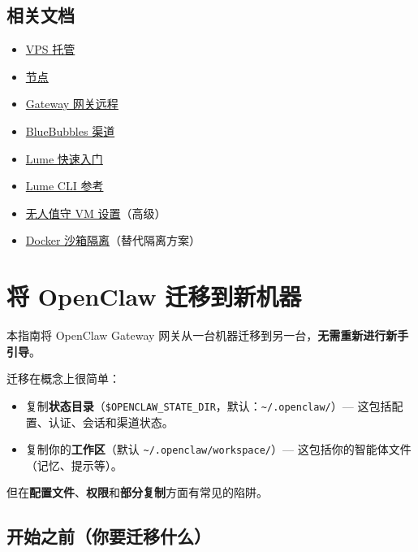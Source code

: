\hrulefill


\subsection{相关文档}


\begin{itemize}
  \item \href{/vps}{VPS 托管}
  \item \href{/nodes}{节点}
  \item \href{/gateway/remote}{Gateway 网关远程}
  \item \href{/channels/bluebubbles}{BlueBubbles 渠道}
  \item \href{https://cua.ai/docs/lume/guide/getting-started/quickstart}{Lume 快速入门}
  \item \href{https://cua.ai/docs/lume/reference/cli-reference}{Lume CLI 参考}
  \item \href{https://cua.ai/docs/lume/guide/fundamentals/unattended-setup}{无人值守 VM 设置}（高级）
  \item \href{/install/docker}{Docker 沙箱隔离}（替代隔离方案）
\end{itemize}



\clearpage

\section{将 OpenClaw 迁移到新机器}


本指南将 OpenClaw Gateway 网关从一台机器迁移到另一台，\textbf{无需重新进行新手引导}。

迁移在概念上很简单：

\begin{itemize}
  \item 复制\textbf{状态目录}（\texttt{\$OPENCLAW\_STATE\_DIR}，默认：\texttt{\textasciitilde{}/.openclaw/}）— 这包括配置、认证、会话和渠道状态。
  \item 复制你的\textbf{工作区}（默认 \texttt{\textasciitilde{}/.openclaw/workspace/}）— 这包括你的智能体文件（记忆、提示等）。
\end{itemize}


但在\textbf{配置文件}、\textbf{权限}和\textbf{部分复制}方面有常见的陷阱。

\subsection{开始之前（你要迁移什么）}


